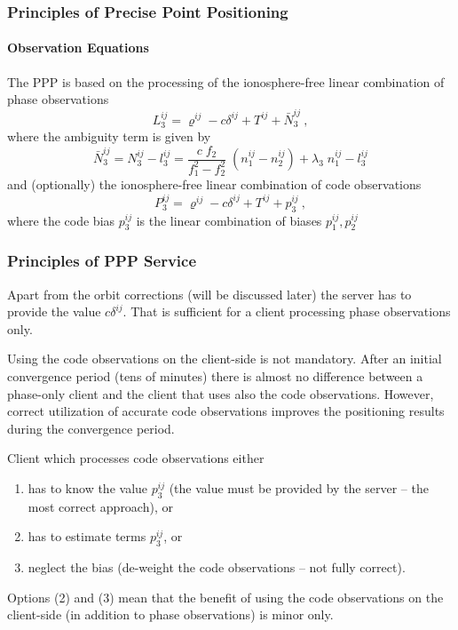 \documentclass[10pt]{beamer}
\newcommand{\be}{\begin{equation}}
\newcommand{\ee}{\end{equation}}
\begin{document}

\begin{frame}
\frametitle{Principles of Precise Point Positioning}
\framesubtitle{Observation Equations}

The PPP is based on the processing of the ionosphere-free linear combination of phase
observations
\be
L^{ij}_3 = \varrho^{ij} - c\delta^{ij} + T^{ij} + \bar{N}^{ij}_3 ~,
\ee 
where the ambiguity term is given by
\be
\bar{N}^{ij}_3 =  N^{ij}_3 - l^{ij}_3 
              = \frac{c\;f_2}{f^2_1-f^2_2}\;(n^{ij}_1-n^{ij}_2) + \lambda_3\;n^{ij}_1 - l^{ij}_3 
\ee
and (optionally) the ionosphere-free linear combination of code observations
\be
P^{ij}_3 = \varrho^{ij} - c\delta^{ij} + T^{ij} + p^{ij}_3 ~,
\ee
where the code bias $p^{ij}_3$ is the linear combination of biases
$p^{ij}_1,p^{ij}_2$
\end{frame}


\begin{frame}
\frametitle{Principles of PPP Service}

Apart from the orbit corrections (will be discussed later) the server has to provide the
value $c\delta^{ij}$. That is sufficient for a client processing phase observations only. 

Using the code observations on the client-side is not mandatory. After an initial convergence
period (tens of minutes) there is almost no difference between a phase-only client and the client
that uses also the code observations. However, correct utilization of accurate code observations
improves the positioning results during the convergence period.

Client which processes code observations either
\begin{enumerate}
\item has to know the value $p^{ij}_3$ (the value must be provided by the server -- the most
  correct approach), or
\item has to estimate terms $p^{ij}_3$, or
\item neglect the bias (de-weight the code observations -- not fully correct).
\end{enumerate}
Options (2) and (3) mean that the benefit of using the code observations on the client-side (in
addition to phase observations) is minor only. 

\end{frame}
\end{document}
